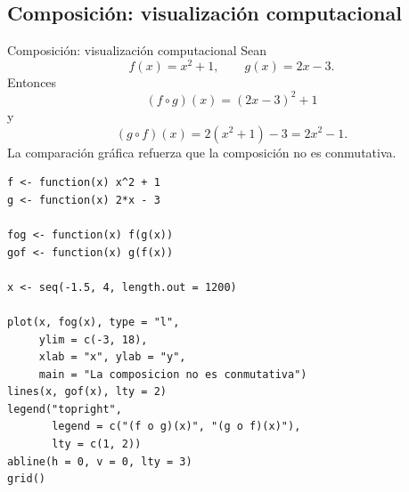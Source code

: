 \documentclass[aspectratio=169,10pt]{beamer}
\begin{document}
\subsection*{Composición: visualización computacional}
\begin{frame}{Composición: visualización computacional}
Sean
\[
f(x)=x^2+1,\qquad g(x)=2x-3.
\]
Entonces
\[
(f\circ g)(x)=(2x-3)^2+1
\]
y
\[
(g\circ f)(x)=2(x^2+1)-3=2x^2-1.
\]
La comparación gráfica refuerza que la composición no es conmutativa.

\begin{center}
\end{center}

\begin{verbatim}
f <- function(x) x^2 + 1
g <- function(x) 2*x - 3

fog <- function(x) f(g(x))
gof <- function(x) g(f(x))

x <- seq(-1.5, 4, length.out = 1200)

plot(x, fog(x), type = "l",
     ylim = c(-3, 18),
     xlab = "x", ylab = "y",
     main = "La composicion no es conmutativa")
lines(x, gof(x), lty = 2)
legend("topright",
       legend = c("(f o g)(x)", "(g o f)(x)"),
       lty = c(1, 2))
abline(h = 0, v = 0, lty = 3)
grid()
\end{verbatim}

\end{frame}
\end{document}
